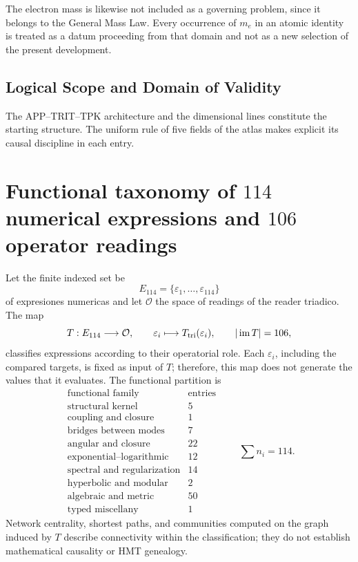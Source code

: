 The electron mass is likewise not included as a governing problem, since it
belongs to the General Mass Law. Every occurrence of \(m_e\) in an
atomic identity is treated as a datum proceeding from that domain and not as
a new selection of the present development.

\subsection*{Logical Scope and Domain of Validity}
The APP--TRIT--TPK architecture and the dimensional lines constitute the
starting structure. The uniform rule of five fields of the atlas makes
explicit its causal discipline in each entry.



\section{Functional taxonomy of \(114\) numerical expressions and \(106\) operator readings}
\label{p3-83-c23-s2:sec:atlas-taxonomico-114-constantes-rev11}

Let the finite indexed set be
\[
 E_{114}=\{\varepsilon_1,\ldots,\varepsilon_{114}\}
\]
of expresiones numericas and let \(\mathcal O\) the space of readings of the
reader triadico. The map
\[
 T:E_{114}\longrightarrow\mathcal O,
 \qquad \varepsilon_i\longmapsto T_{\rm tri}(\varepsilon_i),
 \qquad |\operatorname{im}T|=106,
\]
classifies expressions according to their operatorial role. Each
\(\varepsilon_i\), including the compared targets, is fixed as
input of \(T\); therefore, this map does not generate the values that
it evaluates. The functional partition is
\[
\begin{array}{l|r}
\text{functional family}&\text{entries}\\ \hline
\text{structural kernel}&5\\
\text{coupling and closure}&1\\
\text{bridges between modes}&7\\
\text{angular and closure}&22\\
\text{exponential--logarithmic}&12\\
\text{spectral and regularization}&14\\
\text{hyperbolic and modular}&2\\
\text{algebraic and metric}&50\\
\text{typed miscellany}&1
\end{array}
\qquad
\sum n_i=114.
\]
Network centrality, shortest paths, and communities computed on
the graph induced by \(T\) describe connectivity within the classification;
they do not establish mathematical causality or HMT genealogy.


